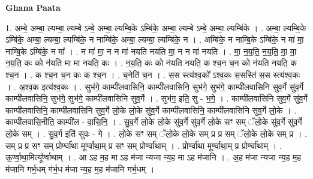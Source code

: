 \documentclass[17pt]{extarticle}
\begin{document}
\textbf{Ghana Paata } \newline

1. अम्बे॒ अम्बा॒ ल्यम्बा॒ ल्यम्बे ऽम्बे॒ अम्बा॒ ल्यम्बि॒के ऽम्बि॑के॒ अम्बा॒ ल्यम्बे ऽम्बे॒ अम्बा॒ ल्यम्बि॑के । . अम्बा॒ ल्यम्बि॒के ऽम्बि॑के॒ अम्बा॒ ल्यम्बा॒ ल्यम्बि॑के॒ न नाम्बि॑के॒ अम्बा॒ ल्यम्बा॒ ल्यम्बि॑के॒ न । . अम्बि॑के॒ न नाम्बि॒के ऽम्बि॑के॒ न मा॑ मा॒ नाम्बि॒के ऽम्बि॑के॒ न मा᳚ । . न मा॑ मा॒ न न मा॑ नयति नयति मा॒ न न मा॑ नयति । . मा॒ न॒य॒ति॒ न॒य॒ति॒ मा॒ मा॒ न॒य॒ति॒ कः को न॑यति मा मा नयति॒ कः । . न॒य॒ति॒ कः को न॑यति नयति॒ क श्च॒न च॒न को न॑यति नयति॒ क श्च॒न । . क श्च॒न च॒न कः क श्च॒न । . च॒नेति॑ च॒न । . स॒स स्त्य॑श्व॒को᳚ ऽश्व॒कः स॒सस्ति॑ स॒स स्त्य॑श्व॒कः । . अ॒श्व॒क इत्य॑श्व॒कः । . सुभ॑गे॒ काम्पी॑लवासिनि॒ काम्पी॑लवासिनि॒ सुभ॑गे॒ सुभ॑गे॒ काम्पी॑लवासिनि सुव॒र्गे सु॑व॒र्गे काम्पी॑लवासिनि॒ सुभ॑गे॒ सुभ॑गे॒ काम्पी॑लवासिनि सुव॒र्गे । . सुभ॑ग॒ इति॒ सु - भ॒गे॒ । . काम्पी॑लवासिनि सुव॒र्गे सु॑व॒र्गे काम्पी॑लवासिनि॒ काम्पी॑लवासिनि सुव॒र्गे लो॒के लो॒के सु॑व॒र्गे काम्पी॑लवासिनि॒ काम्पी॑लवासिनि सुव॒र्गे लो॒के । . काम्पी॑लवासि॒नीति॒ काम्पी॑ल - वा॒सि॒नि॒ । . सु॒व॒र्गे लो॒के लो॒के सु॑व॒र्गे सु॑व॒र्गे लो॒के सꣳ सम् ॅलो॒के सु॑व॒र्गे सु॑व॒र्गे लो॒के सम् । . सु॒व॒र्ग इति॑ सुवः - गे । . लो॒के सꣳ सम् ॅलो॒के लो॒के सम् प्र प्र सम् ॅलो॒के लो॒के सम् प्र । . सम् प्र प्र सꣳ सम् प्रोर्ण्वा॑था मूर्ण्वाथा॒म् प्र सꣳ सम् प्रोर्ण्वा॑थाम् । . प्रोर्ण्वा॑था मूर्ण्वाथा॒म् प्र प्रोर्ण्वा॑थाम् । . ऊ॒र्ण्वा॒था॒मित्यू᳚र्ण्वाथाम् । . आ ऽह म॒ह मा ऽह म॑जा न्यजा न्य॒ह मा ऽह म॑जानि । . अ॒ह म॑जा न्यजा न्य॒ह म॒ह म॑जानि गर्भ॒धम् ग॑र्भ॒ध म॑जा न्य॒ह म॒ह म॑जानि गर्भ॒धम् । \newline
\end{document}
